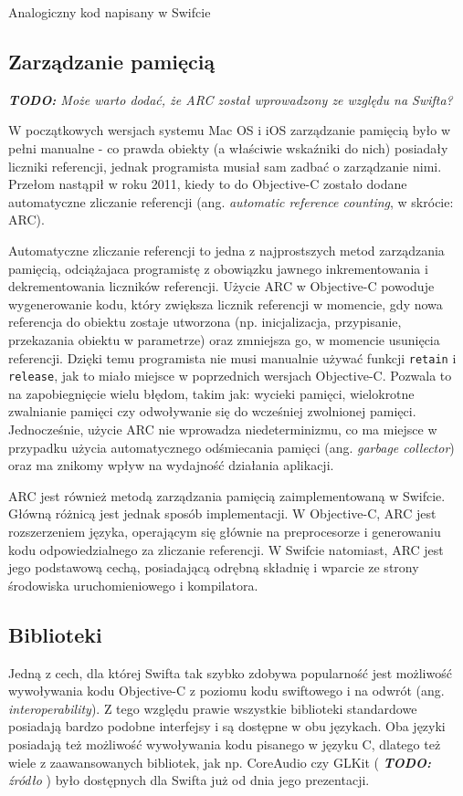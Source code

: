 \documentclass[mgr, shortabstract]{iithesis}
\newcommand{\todo}[1]{
  \textit{\textbf{TODO: }#1}
}
\newcommand{\ang}[1]{ang. \textit{#1}}
\newcommand{\swiftlisting}[2]{
    \swiftcode{src/#1.swift}
    \begin{listing}[ht]
      \caption{#2}
      \label{l:#1}
    \end{listing}
}
\begin{document}
\swiftlisting{3_swift_example}{Analogiczny kod napisany w Swifcie}

\subsection{Zarządzanie pamięcią}
\label{s:zarzadzanie_pamiecia}

\todo{Może warto dodać, że ARC został wprowadzony ze względu na Swifta?}
W początkowych wersjach systemu Mac OS i iOS zarządzanie pamięcią było w pełni manualne - co prawda obiekty (a właściwie wskaźniki do nich) posiadały liczniki referencji, jednak programista musiał sam zadbać o zarządzanie nimi. Przełom nastąpił w roku 2011, kiedy to do Objective-C zostało dodane automatyczne zliczanie referencji (\ang{automatic reference counting}, w skrócie: ARC).

Automatyczne zliczanie referencji to jedna z najprostszych metod zarządzania pamięcią, odciążajaca programistę z obowiązku jawnego inkrementowania i dekrementowania liczników referencji. Użycie ARC w Objective-C powoduje wygenerowanie kodu, który zwiększa licznik referencji w momencie, gdy nowa referencja do obiektu zostaje utworzona (np. inicjalizacja, przypisanie, przekazania obiektu w parametrze) oraz zmniejsza go, w momencie usunięcia referencji. Dzięki temu programista nie musi manualnie używać funkcji \texttt{retain} i \texttt{release}, jak to miało miejsce w poprzednich wersjach Objective-C. Pozwala to na zapobiegnięcie wielu błędom, takim jak: wycieki pamięci, wielokrotne zwalnianie pamięci czy odwoływanie się do wcześniej zwolnionej pamięci. Jednocześnie, użycie ARC nie wprowadza niedeterminizmu, co ma miejsce w przypadku użycia automatycznego odśmiecania pamięci (\ang{garbage collector}) oraz ma znikomy wpływ na wydajność działania aplikacji.

ARC jest również metodą zarządzania pamięcią zaimplementowaną w Swifcie. Główną różnicą jest jednak sposób implementacji. W Objective-C, ARC jest rozszerzeniem języka, operającym się głównie na preprocesorze i generowaniu kodu odpowiedzialnego za zliczanie referencji. W Swifcie natomiast, ARC jest jego podstawową cechą, posiadającą odrębną składnię i wparcie ze strony środowiska uruchomieniowego i kompilatora.

\subsection{Biblioteki}

Jedną z cech, dla której Swifta tak szybko zdobywa popularność jest możliwość wywoływania kodu Objective-C z poziomu kodu swiftowego i na odwrót (\ang{interoperability}). Z tego względu prawie wszystkie biblioteki standardowe posiadają bardzo podobne interfejsy i są dostępne w obu językach. Oba języki posiadają też możliwość wywoływania kodu pisanego w języku C, dlatego też wiele z zaawansowanych bibliotek, jak np. CoreAudio czy GLKit (\todo{źródło}) było dostępnych dla Swifta już od dnia jego prezentacji.
\end{document}
